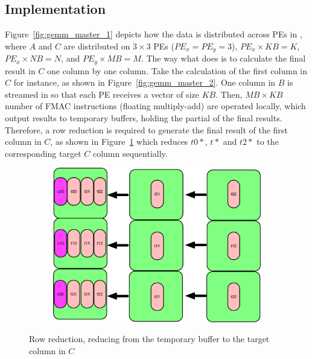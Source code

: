 
\subsection{Implementation}


Figure~\ref{fig:gemm_master_1} depicts how the data is distributed across PEs in \master, where $A$ and $C$ are distributed on $3 \times 3$ PEs ($PE_x = PE_y = 3$), $PE_x \times KB = K$, $PE_x \times NB = N$, and $PE_y \times MB = M$.
%
The way what \master does is to calculate the final result in $C$ one column by one column.
%
Take the calculation of the first column in $C$ for instance, as shown in Figure~\ref{fig:gemm_master_2}.
%
One column in $B$ is streamed in so that each PE receives a vector of size $KB$.
%
Then, $MB \times KB$ number of FMAC instructions (floating multiply-add) are operated locally, which output results to temporary buffers, holding the partial of the final results.
%
Therefore, a row reduction is required to generate the final result of the first column in $C$, as shown in Figure~\ref{fig:gemm_master_3} which reduces $t0*$, $t*$ and $t2*$ to the corresponding target $C$ column sequentially.


\begin{figure}[t!]
  \centering
  \begin{subfigure}{0.70\columnwidth}
    \includegraphics[width=\linewidth]{figures/gemm_A_C_memory_master/3.pdf}
  \end{subfigure}
  \caption{Row reduction, reducing from the temporary buffer to the target column in $C$}
  \label{fig:gemm_master_3}
\end{figure}

